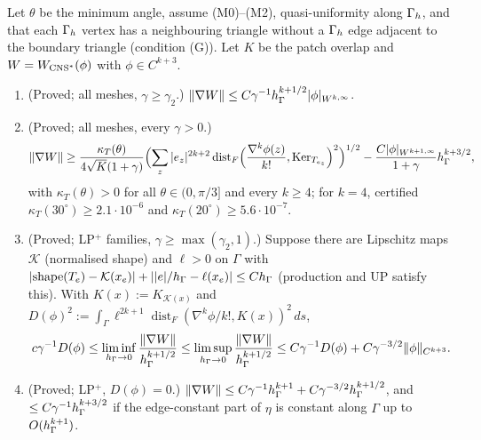 \begin{theorem}\label{rb:final}
Let $\theta$ be the minimum angle, assume (M0)--(M2), quasi-uniformity along $\Gamma_h$, and that each $\Gamma_h$ vertex has a neighbouring triangle without a $\Gamma_h$ edge adjacent to the boundary triangle (condition (G)). Let $K$ be the patch overlap and $W=W_{\mathrm{CNS}^\ast}(\phi)$ with $\phi\in C^{k+3}$.
\begin{enumerate}[label=(\alph*)]
\item (Proved; all meshes, $\gamma\ge\gamma_2$.) $\lVert \nabla W\rVert\le C\gamma^{-1}h_\Gamma^{k+1/2}|\phi|_{W^{k,\infty}}$.
\item (Proved; all meshes, every $\gamma>0$.)
\[
\lVert \nabla W\rVert\ge\frac{\kappa_T(\theta)}{4\sqrt K(1+\gamma)}\Bigl(\sum_z|e_z|^{2k+2}\operatorname{dist}_F\Bigl(\frac{\nabla^k\phi(z)}{k!},\operatorname{Ker}_{T_{e_z}}\Bigr)^2\Bigr)^{1/2}-\frac{C|\phi|_{W^{k+1,\infty}}}{1+\gamma}h_\Gamma^{k+3/2},
\]
with $\kappa_T(\theta)>0$ for all $\theta\in(0,\pi/3]$ and every $k\ge4$; for $k=4$, certified $\kappa_T(30^\circ)\ge2.1\cdot10^{-6}$ and $\kappa_T(20^\circ)\ge5.6\cdot10^{-7}$.
\item (Proved; LP$^+$ families, $\gamma\ge\max(\gamma_2,1)$.) Suppose there are Lipschitz maps $\mathcal K$ (normalised shape) and $\ell>0$ on $\Gamma$ with $|\mathrm{shape}(T_e)-\mathcal K(x_e)|+||e|/h_\Gamma-\ell(x_e)|\le Ch_\Gamma$ (production and \textsf{UP} satisfy this). With $K(x):=K_{\mathcal K(x)}$ and $D(\phi)^2:=\int_\Gamma\ell^{2k+1}\operatorname{dist}_F(\nabla^k\phi/k!,K(x))^2\,ds$,
\[
c\gamma^{-1}D(\phi)\le\liminf_{h_\Gamma\to0}\frac{\lVert \nabla W\rVert}{h_\Gamma^{k+1/2}}\le\limsup_{h_\Gamma\to0}\frac{\lVert \nabla W\rVert}{h_\Gamma^{k+1/2}}\le C\gamma^{-1}D(\phi)+C\gamma^{-3/2}\lVert \phi\rVert_{C^{k+3}} .
\]
\item (Proved; LP$^+$, $D(\phi)=0$.) $\lVert \nabla W\rVert\le C\gamma^{-1}h_\Gamma^{k+1}+C\gamma^{-3/2}h_\Gamma^{k+1/2}$, and $\le C\gamma^{-1}h_\Gamma^{k+3/2}$ if the edge-constant part of $\eta$ is constant along $\Gamma$ up to $O(h_\Gamma^{k+1})$.
\end{enumerate}
\end{theorem}

